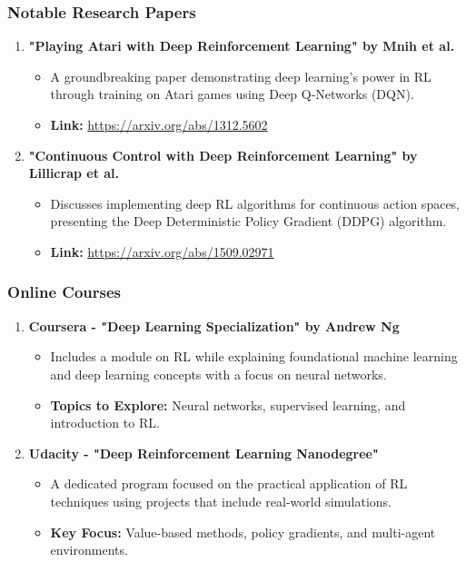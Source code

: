 \documentclass[aspectratio=169]{beamer}
\begin{document}
\begin{frame}[fragile]
    \frametitle{Notable Research Papers}
    \begin{enumerate}
        \item \textbf{"Playing Atari with Deep Reinforcement Learning" by Mnih et al.}
        \begin{itemize}
            \item A groundbreaking paper demonstrating deep learning's power in RL through training on Atari games using Deep Q-Networks (DQN).
            \item \textbf{Link:} \url{https://arxiv.org/abs/1312.5602}
        \end{itemize}

        \item \textbf{"Continuous Control with Deep Reinforcement Learning" by Lillicrap et al.}
        \begin{itemize}
            \item Discusses implementing deep RL algorithms for continuous action spaces, presenting the Deep Deterministic Policy Gradient (DDPG) algorithm.
            \item \textbf{Link:} \url{https://arxiv.org/abs/1509.02971}
        \end{itemize}
    \end{enumerate}
\end{frame}

\begin{frame}[fragile]
    \frametitle{Online Courses}
    \begin{enumerate}
        \item \textbf{Coursera - "Deep Learning Specialization" by Andrew Ng}
        \begin{itemize}
            \item Includes a module on RL while explaining foundational machine learning and deep learning concepts with a focus on neural networks.
            \item \textbf{Topics to Explore:} Neural networks, supervised learning, and introduction to RL.
        \end{itemize}

        \item \textbf{Udacity - "Deep Reinforcement Learning Nanodegree"}
        \begin{itemize}
            \item A dedicated program focused on the practical application of RL techniques using projects that include real-world simulations.
            \item \textbf{Key Focus:} Value-based methods, policy gradients, and multi-agent environments.
        \end{itemize}
    \end{enumerate}
\end{frame}
\end{document}
